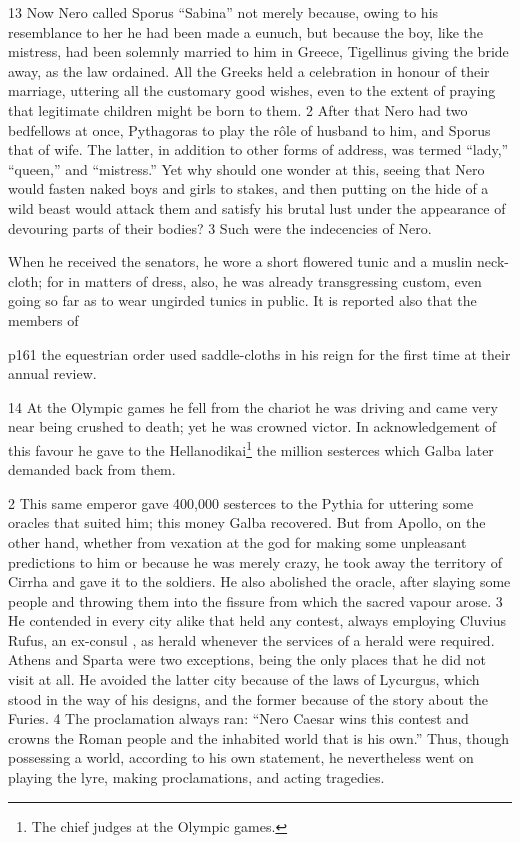 13
Now Nero called Sporus ``Sabina'' not merely because, owing to his resemblance to her he had been made a eunuch, but because the boy, like the mistress, had been solemnly married to him in Greece, Tigellinus giving the bride away, as the law ordained. All the Greeks held a celebration in honour of their marriage, uttering all the customary good wishes, even to the extent of praying that legitimate children might be born to them. 2 After that Nero had two bedfellows at once, Pythagoras to play the rôle of husband to him, and Sporus that of wife. The latter, in addition to other forms of address, was termed ``lady,'' ``queen,'' and ``mistress.'' Yet why should one wonder at this, seeing that Nero would fasten naked boys and girls to stakes, and then putting on the hide of a wild beast would attack them and satisfy his brutal lust under the appearance of devouring parts of their bodies? 3 Such were the indecencies of Nero.

When he received the senators, he wore a short flowered tunic and a muslin neck-cloth; for in matters of dress, also, he was already transgressing custom, even going so far as to wear ungirded tunics in public. It is reported also that the members of

p161 the equestrian order used saddle-cloths in his reign for the first time at their annual review.

14
At the Olympic games he fell from the chariot he was driving and came very near being crushed to death; yet he was crowned victor. In acknowledgement of this favour he gave to the Hellanodikai\texthebrew{⁠}\footnote{The chief judges at the Olympic games.

} the million sesterces which Galba later demanded back from them.

2
This same emperor gave 400,000 sesterces to the Pythia for uttering some oracles that suited him; this money Galba recovered. But from Apollo, on the other hand, whether from vexation at the god for making some unpleasant predictions to him or because he was merely crazy, he took away the territory of Cirrha and gave it to the soldiers. He also abolished the oracle, after slaying some people and throwing them into the fissure from which the sacred vapour arose. 3 He contended in every city alike that held any contest, always employing Cluvius Rufus, an ex-consul , as herald whenever the services of a herald were required. Athens and Sparta were two exceptions, being the only places that he did not visit at all. He avoided the latter city because of the laws of Lycurgus, which stood in the way of his designs, and the former because of the story about the Furies. 4 The proclamation always ran: ``Nero Caesar wins this contest and crowns the Roman people and the inhabited world that is his own.'' Thus, though possessing a world, according to his own statement, he nevertheless went on playing the lyre, making proclamations, and acting tragedies.

